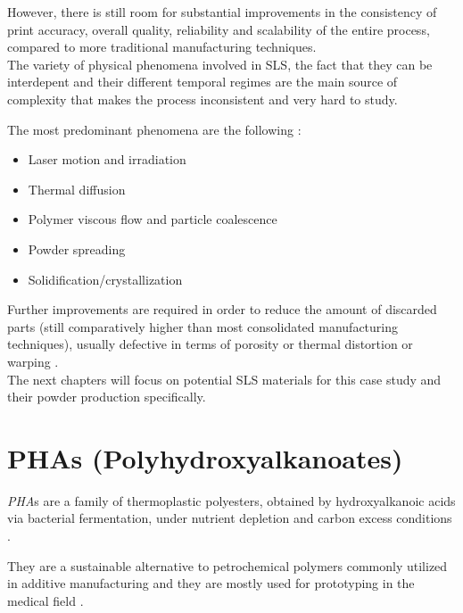 \documentclass{article}
\begin{document}
    However, there is still room for substantial improvements in the consistency of print accuracy, overall quality, reliability 
    and scalability of the entire process, compared to more traditional manufacturing techniques. \\ 

    The variety of physical phenomena involved in SLS, the fact that they can be interdepent and their different temporal regimes are the main 
    source of complexity that makes the process inconsistent and very hard to study. 

    The most predominant phenomena are the following \autocite*{Padovano_SLS_Review}: 

    \begin{itemize}
        \item Laser motion and irradiation
        \item Thermal diffusion
        \item Polymer viscous flow and particle coalescence 
        \item Powder spreading
        \item Solidification/crystallization 
    \end{itemize} 
    
    Further improvements are required in order to reduce the amount of discarded parts (still comparatively 
    higher than most consolidated manufacturing techniques), usually defective in terms of porosity or 
    thermal distortion or warping \autocite*{Padovano_SLS_Review}. \\ 

    The next chapters will focus on potential SLS materials for this case study and their powder production specifically. \clearpage

    \section{PHAs (Polyhydroxyalkanoates)  \label{PHA_in_general}}

    \textit{PHA}s are a family of thermoplastic polyesters, obtained by hydroxyalkanoic acids via bacterial fermentation, under 
    nutrient depletion and carbon excess conditions \autocites{Kovalcik_PHA_Review}{Messori_Bondioli_PHAs}. 

    They are a sustainable alternative to petrochemical polymers commonly utilized in 
    additive manufacturing and they are mostly used for prototyping in the medical field \autocites{Kovalcik_PHA_Review}{Messori_Bondioli_PHAs}. 
\end{document}
